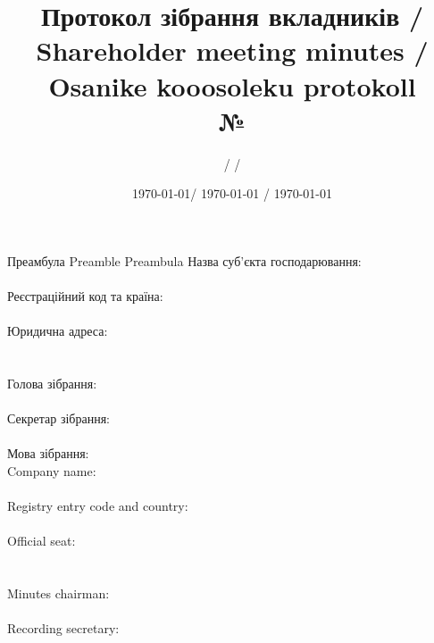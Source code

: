   \begin{Form}
    \title{Протокол зібрання вкладників / Shareholder meeting minutes / Osanike kooosoleku protokoll\\№ }
    \author{ /  / }
    \date{\today / \textenglish{\today} / \textestonian{\today}}
    \maketitle
    \thispagestyle{fancy}

    \begin{paracol}{3}
      \clause %
        {Преамбула}
        {Preamble}
        {Preambula}
        { Назва суб’єкта господарювання:\\
          \\
          Реєстраційний код та країна:\\
          \\
          Юридична адреса:\\
          \\
          \\
          Голова зібрання:\\
          \\
          Секретар зібрання:\\
          \\
          Мова зібрання:\\
        }
        { Company name:\\
        \\
          Registry entry code and country:\\
          \\
          Official seat:\\
          \\
          \\
          Minutes chairman:\\
          \\
          Recording secretary:\\
}
\end{paracol}
\end{Form}

